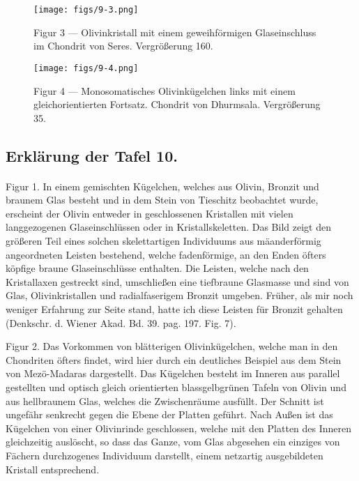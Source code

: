 \documentclass[a4paper, 12pt, oneside]{article}
\begin{document}
\vspace*{\fill}
\begin{figure}[H]
\centering
\texttt{[image: figs/9-3.png]}
\caption{\small Figur 3 --- Olivinkristall mit einem geweihförmigen Glaseinschluss im Chondrit von Seres. Vergrößerung 160.}
\end{figure}
\vspace*{\fill}
\clearpage

\vspace*{\fill}
\begin{figure}[H]
\centering
\texttt{[image: figs/9-4.png]}
\caption{\small Figur 4 --- Monosomatisches Olivinkügelchen links mit einem gleichorientierten Fortsatz. Chondrit von Dhurmsala. Vergrößerung 35.}
\end{figure}
\vspace*{\fill}
\clearpage

\subsection{Erklärung der Tafel 10.}
\paragraph{}
Figur 1. In einem gemischten Kügelchen, welches aus Olivin, Bronzit und braunem Glas besteht und in dem Stein von Tieschitz beobachtet wurde, erscheint der Olivin entweder in geschlossenen Kristallen mit vielen langgezogenen Glaseinschlüssen oder in Kristallskeletten. Das Bild zeigt den größeren Teil eines solchen skelettartigen Individuums aus mäanderförmig angeordneten Leisten bestehend, welche fadenförmige, an den Enden öfters köpfige braune Glaseinschlüsse enthalten. Die Leisten, welche nach den Kristallaxen gestreckt sind, umschließen eine tiefbraune Glasmasse und sind von Glas, Olivinkristallen und radialfaserigem Bronzit umgeben. Früher, als mir noch weniger Erfahrung zur Seite stand, hatte ich diese Leisten für Bronzit gehalten (Denkschr. d. Wiener Akad. Bd. 39. pag. 197. Fig. 7).

Figur 2. Das Vorkommen von blätterigen Olivinkügelchen, welche man in den Chondriten öfters findet, wird hier durch ein deutliches Beispiel aus dem Stein von Mezö-Madaras dargestellt. Das Kügelchen besteht im Inneren aus parallel gestellten und optisch gleich orientierten blassgelbgrünen Tafeln von Olivin und aus hellbraunem Glas, welches die Zwischenräume ausfüllt. Der Schnitt ist ungefähr senkrecht gegen die Ebene der Platten geführt. Nach Außen ist das Kügelchen von einer Olivinrinde geschlossen, welche mit den Platten des Inneren gleichzeitig auslöscht, so dass das Ganze, vom Glas abgesehen ein einziges von Fächern durchzogenes Individuum darstellt, einem netzartig ausgebildeten Kristall entsprechend.
\end{document}
